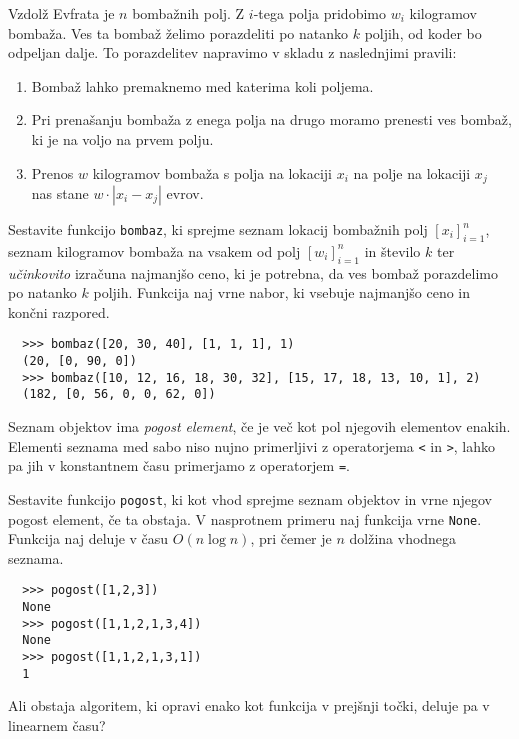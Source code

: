 \documentclass[arhiv]{../izpit}
\begin{document}
  Vzdolž Evfrata je $n$ bombažnih polj. Z $i$-tega polja pridobimo $w_i$
  kilogramov bombaža. Ves ta bombaž želimo porazdeliti po natanko $k$
  poljih, od koder bo odpeljan dalje. To porazdelitev napravimo v
  skladu z naslednjimi pravili:

  \begin{enumerate}
    \item Bombaž lahko premaknemo med katerima koli poljema.
    \item Pri prenašanju bombaža z enega polja na drugo moramo prenesti
    ves bombaž, ki je na voljo na prvem polju.
    \item Prenos $w$ kilogramov bombaža s polja na lokaciji $x_i$ na polje
    na lokaciji $x_j$ nas stane $w \cdot |x_i - x_j|$ evrov.
  \end{enumerate}

 Sestavite funkcijo \texttt{bombaz}, ki sprejme seznam
 lokacij bombažnih polj $[x_i]_{i=1}^n$, seznam kilogramov bombaža na vsakem od polj 
 $[w_i]_{i=1}^n$ in
 število $k$ ter {\em učinkovito} izračuna najmanjšo ceno, ki je potrebna,
 da ves bombaž porazdelimo po natanko $k$ poljih.
 Funkcija naj vrne nabor, ki vsebuje najmanjšo ceno in končni razpored.

  \begin{verbatim}
  >>> bombaz([20, 30, 40], [1, 1, 1], 1)
  (20, [0, 90, 0])
  >>> bombaz([10, 12, 16, 18, 30, 32], [15, 17, 18, 13, 10, 1], 2)
  (182, [0, 56, 0, 0, 62, 0])
  \end{verbatim}


  Seznam objektov ima {\em pogost element}, če je več kot pol njegovih elementov
  enakih. Elementi seznama med sabo niso nujno primerljivi z operatorjema \texttt{<}
  in \texttt{>}, lahko pa jih v konstantnem času primerjamo z operatorjem
  \texttt{=}. 

  \podnaloga Sestavite funkcijo \texttt{pogost}, ki kot vhod sprejme seznam
  objektov in vrne njegov pogost element, če ta obstaja. V nasprotnem primeru naj
  funkcija vrne \texttt{None}. Funkcija naj deluje v času $O(n \log n)$, pri 
  čemer je $n$ dolžina vhodnega seznama.

  \begin{verbatim}
  >>> pogost([1,2,3])
  None
  >>> pogost([1,1,2,1,3,4])
  None
  >>> pogost([1,1,2,1,3,1])
  1
  \end{verbatim}

  \podnaloga Ali obstaja algoritem, ki opravi enako kot funkcija v prejšnji
  točki, deluje pa v linearnem času?
\end{document}
